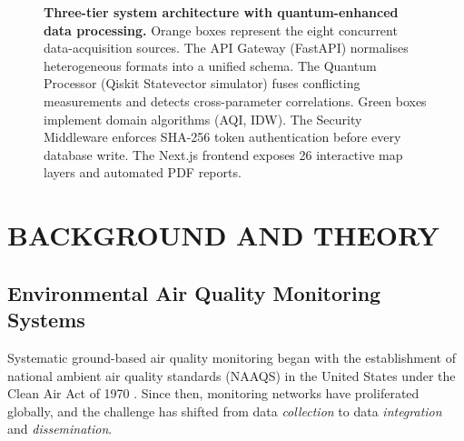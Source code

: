 \documentclass[12pt,a4paper]{article}
\begin{document}
\begin{figure}[H]
\caption[Three-tier system architecture with quantum-enhanced data processing]{%
  \textbf{Three-tier system architecture with quantum-enhanced data processing.}
  Orange boxes represent the eight concurrent data-acquisition sources.
  The API Gateway (FastAPI) normalises heterogeneous formats into a unified
  schema. The Quantum Processor (Qiskit Statevector simulator) fuses
  conflicting measurements and detects cross-parameter correlations.
  Green boxes implement domain algorithms (AQI, IDW). The Security Middleware
  enforces SHA-256 token authentication before every database write. The
  Next.js frontend exposes 26 interactive map layers and automated PDF reports.}
\label{fig:architecture}
\end{figure}
\section{BACKGROUND AND THEORY}
\label{sec:litreview}

\subsection{Environmental Air Quality Monitoring Systems}
\label{sec:litreview:monitoring}

Systematic ground-based air quality monitoring began with the establishment of
national ambient air quality standards (NAAQS) in the United States under the
Clean Air Act of 1970 \cite{epa2012}. Since then, monitoring networks have
proliferated globally, and the challenge has shifted from data \emph{collection}
to data \emph{integration} and \emph{dissemination}.
\end{document}
